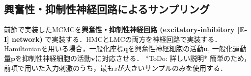 \subsection{興奮性・抑制性神経回路によるサンプリング}前節で実装したMCMCを\textbf{興奮性・抑制性神経回路 (excitatory-inhibitory [E-I] network)} で実装する．HMCとLMCの両方を神経回路で実装する．
Hamiltonianを用いる場合，一般化座標$\mathbf{q}$を興奮性神経細胞の活動$\mathbf{u}$, 一般化運動量$\mathbf{p}$を抑制性神経細胞の活動$\mathbf{v}$に対応させる．
*ToDo: 詳しい説明*
簡単のため，前項で用いた入力刺激のうち，最も$z$が大きいサンプルのみを使用する．